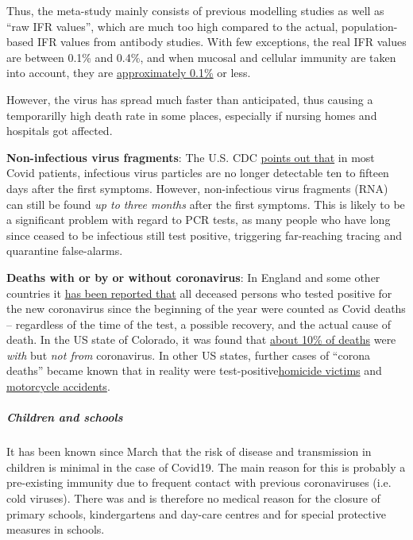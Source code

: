 Thus, the meta-study mainly consists of previous modelling studies as
well as ``raw IFR values'', which are much too high compared to the
actual, population-based IFR values from antibody studies. With few
exceptions, the real IFR values are between 0.1\% and 0.4\%, and when
mucosal and cellular immunity are taken into account, they are
\href{https://swprs.org/studies-on-covid-19-lethality/}{approximately
0.1\%} or less.

However, the virus has spread much faster than anticipated, thus causing
a temporarilly high death rate in some places, especially if nursing
homes and hospitals got affected.

\textbf{Non-infectious virus fragments}: The U.S. CDC
\href{https://www.cdc.gov/coronavirus/2019-ncov/hcp/duration-isolation.html}{points
out that} in most Covid patients, infectious virus particles are no
longer detectable ten to fifteen days after the first symptoms. However,
non-infectious virus fragments (RNA) can still be found \emph{up to
three months} after the first symptoms. This is likely to be a
significant problem with regard to PCR tests, as many people who have
long since ceased to be infectious still test positive, triggering
far-reaching tracing and quarantine false-alarms.

\textbf{Deaths with or by or without coronavirus}: In England and some
other countries it
\href{https://www.cebm.net/covid-19/why-no-one-can-ever-recover-from-covid-19-in-england-a-statistical-anomaly/}{has
been reported that} all deceased persons who tested positive for the new
coronavirus since the beginning of the year were counted as Covid deaths
-- regardless of the time of the test, a possible recovery, and the
actual cause of death. In the US state of Colorado, it was found that
\href{https://covid19.colorado.gov/data/case-data}{about 10\% of deaths}
were \emph{with} but \emph{not from} coronavirus. In other US states,
further cases of ``corona deaths'' became known that in reality were
test-positive\href{https://cbs12.com/news/local/i-team-deaths-incorrectly-attributed-to-covid-19-in-palm-beach-county}{homicide
victims} and
\href{https://www.fox35orlando.com/news/fox-35-investigates-questions-raised-after-fatal-motorcycle-crash-listed-as-covid-19-death}{motorcycle
accidents}.

\hypertarget{children-and-schools}{%
\subparagraph{\texorpdfstring{\textbf{Children and
schools}}{Children and schools}}\label{children-and-schools}}

It has been known since March that the risk of disease and transmission
in children is minimal in the case of Covid19. The main reason for this
is probably a pre-existing immunity due to frequent contact with
previous coronaviruses (i.e. cold viruses). There was and is therefore
no medical reason for the closure of primary schools, kindergartens and
day-care centres and for special protective measures in schools.

